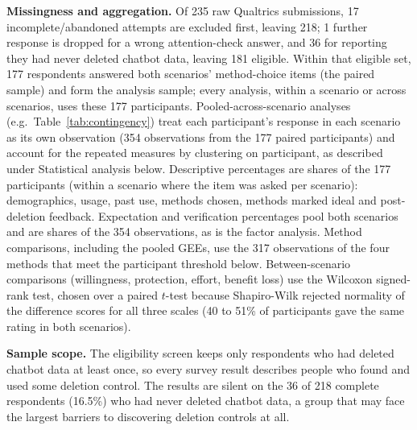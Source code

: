 \documentclass[conference,compsoc]{IEEEtran}
\begin{document}
\textbf{Missingness and aggregation.} Of 235 raw Qualtrics submissions,
17 incomplete/abandoned attempts are excluded first, leaving 218; 1
further response is dropped for a wrong attention-check answer, and 36 for reporting
they had never deleted chatbot data, leaving 181 eligible.
Within that eligible set, 177 respondents answered both scenarios'
method-choice items (the paired sample) and form the analysis sample; every
analysis, within a scenario or across scenarios, uses these 177 participants.
Pooled-across-scenario analyses (e.g.\ Table~\ref{tab:contingency}) treat
each participant's response in each scenario as its own observation (354
observations from the 177 paired participants) and account for the repeated
measures by clustering on participant, as described under Statistical
analysis below. Descriptive percentages are shares of the 177 participants (within a
scenario where the item was asked per scenario): demographics, usage, past use,
methods chosen, methods marked ideal and post-deletion feedback. Expectation
and verification percentages pool both scenarios and are shares of the 354
observations, as is the factor analysis. Method comparisons, including the pooled GEEs, use the 317
observations of the four methods that meet the participant threshold
below. Between-scenario comparisons
(willingness, protection, effort, benefit loss) use the Wilcoxon signed-rank
test, chosen over a paired $t$-test because Shapiro-Wilk rejected normality of
the difference scores for all three scales (40 to 51\% of participants gave the
same rating in both scenarios).

\textbf{Sample scope.} The eligibility screen keeps only respondents who
had deleted chatbot data at least once, so every survey result describes
people who found and used some deletion control. The results are silent on
the 36 of 218 complete respondents (16.5\%) who had never deleted chatbot
data, a group that may face the largest barriers to discovering deletion
controls at all.
\end{document}
